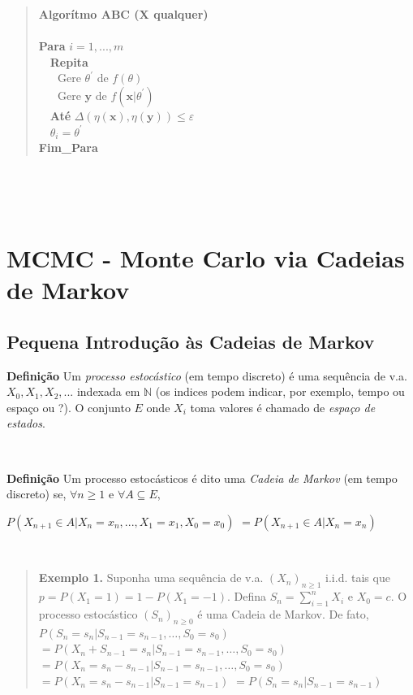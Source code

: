 \documentclass[
]{book}
\begin{document}
\begin{quote}
\textbf{Algorítmo ABC (\(\boldsymbol X\) qualquer)}\\
\(~\)\\
\textbf{Para} \(i=1,...,m\)\\
\(~~~\) \textbf{Repita}\\
\(~~~~~~\) Gere \(\theta^\prime\) de \(f(\theta)\)\\
\(~~~~~~\) Gere \(\boldsymbol y\) de \(f(\boldsymbol x|\theta^\prime)\)\\
\(~~~\) \textbf{Até} \(\Delta(\eta(\boldsymbol x),\eta(\boldsymbol y))\leq \varepsilon\)\\
\(~~~\) \(\theta_i=\theta^\prime\)\\
\textbf{Fim\_Para}
\end{quote}

\(~\)

\(~\)

\hypertarget{mcmc---monte-carlo-via-cadeias-de-markov}{%
\section{MCMC - Monte Carlo via Cadeias de Markov}\label{mcmc---monte-carlo-via-cadeias-de-markov}}

\hypertarget{pequena-introduuxe7uxe3o-uxe0s-cadeias-de-markov}{%
\subsection{Pequena Introdução às Cadeias de Markov}\label{pequena-introduuxe7uxe3o-uxe0s-cadeias-de-markov}}

\textbf{Definição} Um \emph{processo estocástico} (em tempo discreto) é uma sequência de v.a. \(X_0,X_1,X_2,...\) indexada em \(\mathbb{N}\) (os indices podem indicar, por exemplo, tempo ou espaço ou ?). O conjunto \(E\) onde \(X_i\) toma valores é chamado de \emph{espaço de estados}.

\(~\)

\textbf{Definição} Um processo estocásticos é dito uma \emph{Cadeia de Markov} (em tempo discreto) se, \(\forall n \geq 1\) e \(\forall A \subseteq E\),

\(P(X_{n+1}\in A|X_{n}=x_{n},...,X_1=x_1,X_0=x_0)\) \(=P(X_{n+1}\in A|X_{n}=x_{n})\)

\(~\)

\begin{quote}
\textbf{Exemplo 1.} Suponha uma sequência de v.a. \(\left(X_n\right)_{n\geq 1}\) i.i.d. tais que \(p=P(X_1=1)=1-P(X_1=-1)\). Defina \(S_n=\displaystyle \sum_{i=1}^n X_i\) e \(X_0=c\). O processo estocástico \((S_n)_{n\geq 0}\) é uma Cadeia de Markov. De fato,\\
\(P\left(S_n=s_n|S_{n-1}=s_{n-1},\ldots,S_0=s_0\right)\)
\(=\displaystyle P\left(X_n+S_{n-1}=s_{n}|S_{n-1}=s_{n-1},\ldots,S_0=s_0\right)\)\\
\(=\displaystyle P\left(X_n=s_n-s_{n-1}|S_{n-1}=s_{n-1},\ldots,S_0=s_0\right)\)
\(=\displaystyle P\left(X_n=s_n-s_{n-1}|S_{n-1}=s_{n-1}\right)\)
\(=\displaystyle P\left(S_n=s_n|S_{n-1}=s_{n-1}\right)\)
\end{quote}
\end{document}

